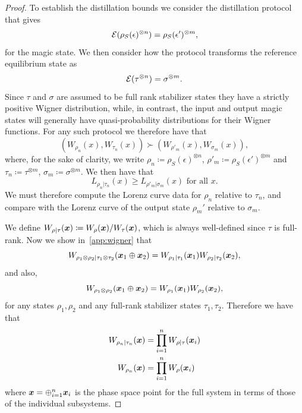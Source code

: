 \begin{proof}
To establish the distillation bounds we consider the distillation protocol that gives
\begin{equation}
	{\mathcal E}( \rho_S(\epsilon)^{\otimes n}) = \rho_S(\epsilon')^{\otimes m},
\end{equation}
for the magic state. We then consider how the protocol transforms the reference equilibrium state as
\begin{equation}
	{\mathcal E}( \tau^{\otimes n}) = \sigma^{\otimes m}.
\end{equation}
Since $\tau$ and $\sigma$ are assumed to be full rank stabilizer states they have a strictly positive Wigner distribution, while, in contrast, the input and output magic states will generally have quasi-probability distributions for their Wigner functions. For any such protocol we therefore have that
\begin{equation}
	(W_{\rho_n} (x), W_{\tau_n}(x) ) \succ  (W_{\rho'_m} (x), W_{\sigma_m}(x) ),
\end{equation}
where, for the sake of clarity, we write $\rho_n \coloneqq \rho_S(\epsilon)^{\otimes n}$, $\rho'_m \coloneqq \rho_S(\epsilon')^{\otimes m}$ and $\tau_n \coloneqq \tau^{\otimes m}$, $\sigma_m \coloneqq \sigma^{\otimes m}$. We then have that
\begin{equation}
	L_{\rho_n |\tau_n}(x) \ge L_{\rho'_m |\sigma_m}(x) \mbox{ for all } x.
\end{equation}
We must therefore compute the Lorenz curve data for $\rho_n$ relative to $\tau_n$, and compare with the Lorenz curve of the output state $\rho_m'$ relative to $\sigma_m$.

We define $W_{\rho | \tau}(\boldsymbol{x}) \coloneqq W_\rho(\boldsymbol{x})/W_\tau(\boldsymbol{x})$, which is always well-defined since $\tau$ is full-rank. Now we show in~\cref{app:wigner} that
\begin{equation}
W_{\rho_1\otimes \rho_2 | \tau_1 \otimes \tau_2} (\boldsymbol{x}_1 \oplus \boldsymbol{x}_2) = W_{\rho_1 | \tau_1}(\boldsymbol{x}_1)W_{\rho_2 | \tau_2}(\boldsymbol{x}_2),
\end{equation}
and also,
\begin{equation}
W_{\rho_1\otimes \rho_2} (\boldsymbol{x}_1 \oplus \boldsymbol{x}_2) = W_{\rho_1}(\boldsymbol{x}_1)W_{\rho_2}(\boldsymbol{x}_2),
\end{equation}
for any states $\rho_1, \rho_2$ and any full-rank stabilizer states $\tau_1, \tau_2$.  
Therefore we have that
\begin{align}
W_{\rho_n |\tau_n} (\boldsymbol{x}) &= \prod_{i=1}^n W_{\rho|\tau}(\boldsymbol{x}_i)\\
W_{\rho_n } (\boldsymbol{x}) &= \prod_{i=1}^n W_\rho(\boldsymbol{x}_i)
\end{align}
where $\boldsymbol{x} = \oplus_{i=1}^n \boldsymbol{x}_i$ is the phase space point for the full system in terms of those of the individual subsystems.


\end{proof}
